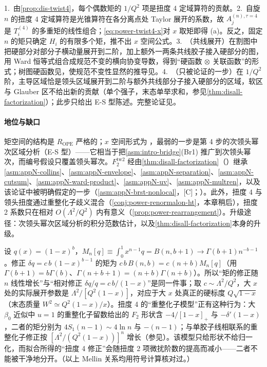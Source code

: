 \begin{proofsketch}
1.~由\cref{prop:dis-twist4}，每个偶数矩的 $1/Q^2$ 项是扭度 4 定域算符的贡献。2.~自旋 $n$ 的扭度 4 定域算符是光锥算符在各分离点处 Taylor 展开的系数，故 $A^{(n),\tau=4}_j$ 是 $T^{(4)}_i$ 的多重矩的线性组合；\eqref{eq:power-twist4-x}对 $x$ 取矩即得 (a)。反之，固定 $n$ 的矩只确定 $H_i$ 的有限多个矩，推不出 $x$ 空间公式。3.~（共线展开）在割图中把硬部分对部分子横动量展开到二阶，加上额外一两条共线胶子接入硬部分的图，用 Ward 恒等式组合成规范不变的横向协变导数，得到“硬函数 $\otimes$ 关联函数”的形式\cite{EllisFurmanskiPetronzio1982,EllisFurmanskiPetronzio1983}；树图硬函数见\cite{Jaffe:1982pm,EllisFurmanskiPetronzio1983}，使规范不变性显然的推导见\cite{Qiu:1988dn}。4.~（只被论证的一步）在 $1/Q^2$ 阶，主导区域恰是领头区域展开到二阶与额外共线部分子接入硬部分的区域，软区与 Glauber 区不给出新的贡献（单个强子，末态单举求和，参见\cref{thm:disall-factorization}）；此步只给出 E-S 型陈述。完整论证见\cite{EllisFurmanskiPetronzio1983,Qiu:1988dn}。
\end{proofsketch}

\paragraph{地位与缺口}
矩空间的结构是 $R_{\mathrm{OPE}}$ 严格的；$x$ 空间形式为 \tagA，最弱的一步是第 4 步的次领头幂次区域分析（E-S 型）——它相当于把\cref{asm:intro-bridge}(Br1) 推广到次领头幂次，而编号假设只覆盖领头幂次。$F_2^{\mathrm{tw2}}$ 经由\cref{thm:disall-factorization}（\tagA）继承 \cref{asm:appN-collins}、\cref{asm:appN-envelope}、\cref{asm:appN-separation}、\cref{asm:appN-cutsum}、\cref{asm:appN-ward-product}、\cref{asm:appN-uv}、\cref{asm:appN-multren}，以及该论证中被明确假定的一步（\cref{asm:appN-brst-nonlocal}，[C]；\cite[第~11.3.2~节]{Collins2011}）。此外，扭度 4 与领头扭度通过重整化子歧义混合（\cref{conj:power-renormalon-ht}，本章稍后），扭度 2 系数只在相对 $O(\Lambda^2/Q^2)$ 内有意义（\cref{prop:power-rearrangement}）。升级途径：次领头幂次区域分析的积分范数估计，以及\cref{thm:disall-factorization}本身的升级。

\begin{example}\label{ex:power-twist4-largex}
设 $q(x)=(1-x)^b$，$M_n[q]\equiv\int_0^1x^{n-1}q=B(n,b+1)\to\Gamma(b+1)n^{-b-1}$。修正 $\delta q=c\,b\,(1-x)^{b-1}$ 的矩为 $c\,b\,B(n,b)=c\,(n+b)M_n[q]$（用 $\Gamma(b+1)=b\Gamma(b)$、$\Gamma(n+b+1)=(n+b)\Gamma(n+b)$）。所以“矩的修正随 $n$ 线性增长”与“相对修正 $\delta q/q=c\,b/(1-x)$”是同一件事；取 $c\sim\Lambda^2/Q^2$，大 $x$ 处的实际展开参数是 $\Lambda^2/[Q^2(1-x)]$，对应于大 $x$ 处真正的硬标度 $Q\sqrt{1-x}$（末态质量 $W^2\simeq Q^2(1-x)/x$）。扭度 4 的“重整化子模型”正有这种行为：大 $\beta_0$ 近似中 $u=1$ 的重整化子留数给出的 $F_2$ 形状含 $-4/[1-x]_+$ 与 $-\delta'(1-x)$\cite[式~(5.33)]{Beneke1999}，二者的矩分别为 $4S_1(n-1)\sim4\ln n$ 与 $-(n-1)$；与单胶子线相联系的重整化子修正按 $[\Lambda^2/(Q^2(1-x))]^n$ 增长\cite[式~(5.37)]{Beneke1999}（参见\cite{BenekeBraun1995b,DasguptaWebber1996}）。该模型只给形状不给归一化，而拟合所得的“扭度 4 修正”会随扭度 2 项微扰阶数的提高而减小\cite[第~5.2.4~节]{Beneke1999}——二者不能被干净地分开。（以上 Mellin 关系均用符号计算核对过。）
\end{example}

